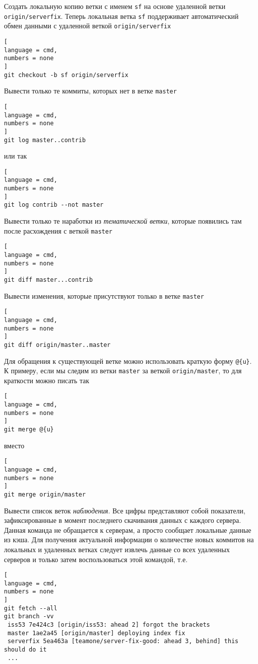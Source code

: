 \documentclass[%
	11pt,
	a4paper,
	utf8,
		]{article}
\begin{document}
Создать локальную копию ветки с именем \texttt{sf} на основе удаленной ветки \texttt{origin/serverfix}. Теперь локальная ветка \texttt{sf} поддерживает автоматический обмен данными с удаленной веткой \texttt{origin/serverfix}

\begin{lstlisting}[
language = cmd,
numbers = none
]
git checkout -b sf origin/serverfix
\end{lstlisting}


Вывести только те коммиты, которых нет в ветке \texttt{master}

\begin{lstlisting}[
language = cmd,
numbers = none
]
git log master..contrib
\end{lstlisting}
или так
\begin{lstlisting}[
language = cmd,
numbers = none
]
git log contrib --not master
\end{lstlisting}


Вывести только те наработки из \emph{тематической ветки}, которые появились там после расхождения с веткой \texttt{master}

\begin{lstlisting}[
language = cmd,
numbers = none
]
git diff master...contrib
\end{lstlisting}

Вывести изменения, которые присутствуют только в ветке \texttt{master}

\begin{lstlisting}[
language = cmd,
numbers = none
]
git diff origin/master..master
\end{lstlisting}

Для обращения к существующей ветке можно использовать краткую форму \texttt{@\{u\}}. К примеру, если мы следим из ветки \texttt{master} за веткой \texttt{origin/master}, то для краткости можно писать так

\begin{lstlisting}[
language = cmd,
numbers = none
]
git merge @{u}
\end{lstlisting}
вместо
\begin{lstlisting}[
language = cmd,
numbers = none
]
git merge origin/master
\end{lstlisting}

Вывести список веток \emph{наблюдения}. Все цифры представляют собой показатели, зафиксированные в момент последнего скачивания данных с каждого сервера. Данная команда не обращается к серверам, а просто сообщает локальные данные из кэша. Для получения актуальной информации о количестве новых коммитов на локальных и удаленных ветках следует извлечь данные со всех удаленных серверов и только затем воспользоваться этой командой, т.е.
\begin{lstlisting}[
language = cmd,
numbers = none
]
git fetch --all
git branch -vv
 iss53 7e424c3 [origin/iss53: ahead 2] forgot the brackets
 master 1ae2a45 [origin/master] deploying index fix
 serverfix 5ea463a [teamone/server-fix-good: ahead 3, behind] this should do it
 ...
\end{lstlisting} 
\end{document}

